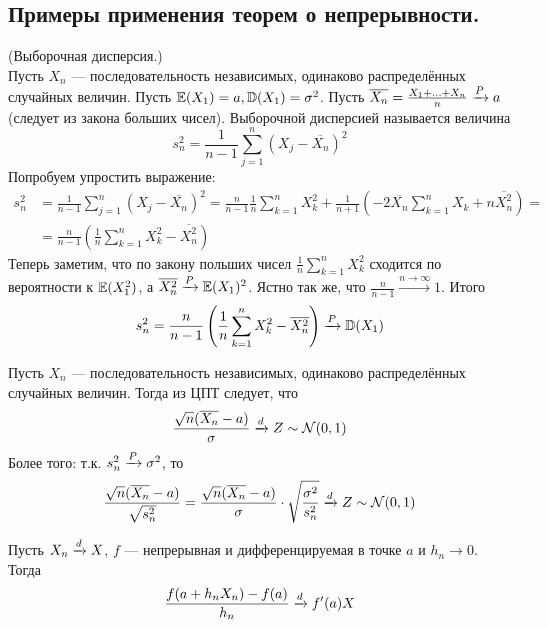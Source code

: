 \subsection{Примеры применения теорем о непрерывности.}
\begin{example}(Выборочная дисперсия.)
    \\
    Пусть $X_n$ --- последовательность независимых, одинаково распределённых случайных величин. Пусть
    $\mathbb{E}(X_1) = a, \mathbb{D}(X_1) = \sigma^2$. Пусть $\overline{X_n} = \frac{X_1 + \ldots + X_n}{n} \xrightarrow{P} a$ (следует
    из закона больших чисел). Выборочной дисперсией называется величина
    \[
        s^2_n = \frac{1}{n - 1}\sum_{j = 1}^{n}(X_j - \overline{X_n})^2
    \]
    Попробуем упростить выражение:
    \begin{align*}
        s^2_n &= \frac{1}{n - 1}\sum_{j = 1}^{n}(X_j - \overline{X_n})^2 =
        \frac{n}{n - 1}\frac{1}{n}\sum_{k = 1}^{n} X_k^2 + \frac{1}{n + 1}\left( -2\overline{X_n}\sum_{k = 1}^{n}X_k + n\overline{X_n^2} \right)=\\
        &= \frac{n}{n-1}\left( \frac{1}{n} \sum_{k = 1}^{n} X_k^2 - \overline{X_n^2} \right)
    \end{align*}
    Теперь заметим, что по закону польших чисел $\frac{1}{n} \sum_{k = 1}^{n} X_k^2$ сходится по вероятности
    к $\mathbb{E}(X_1^2)$, а $\overline{X_n^2} \xrightarrow{P} \mathbb{E}(X_1)^2$. Ястно так же, что $\frac{n}{n -1} \xrightarrow{n \to \infty} 1$.
    Итого
    \[
        s^2_n = \frac{n}{n-1}\left( \frac{1}{n} \sum_{k = 1}^{n} X_k^2 - \overline{X_n^2} \right) \xrightarrow{P} \mathbb{D}(X_1)
    \]
\end{example}
\begin{example}
    Пусть $X_n$ --- последовательность независимых, одинаково распределённых случайных величин.
    Тогда из ЦПТ следует, что
    \[
        \frac{\sqrt {n}(\overline{X_n} - a)}{\sigma} \xrightarrow{d} Z \sim \mathcal{N}(0, 1)
    \]
    Более того: т.к. $s_n^2 \xrightarrow{P} \sigma^2$, то
    \[
        \frac{\sqrt {n}(\overline{X_n} - a)}{\sqrt {s_n^2}} =
        \frac{\sqrt {n}(\overline{X_n} - a)}{\sigma} \cdot
        \sqrt {\frac{\sigma^2}{s_n^2}} \xrightarrow{d} Z \sim \mathcal{N}(0, 1)
    \]
\end{example}
\begin{proposal}
    Пусть $X_n \xrightarrow{d} X$, $f$ --- непрерывная и дифференцируемая в точке $a$ и $h_n \to 0$. Тогда
    \[
        \frac{f(a + h_nX_n) - f(a)}{h_n} \xrightarrow{d} f'(a)X
    \]
\end{proposal}
